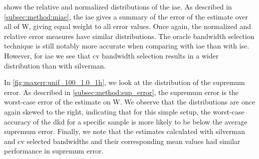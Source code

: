  shows the relative and normalized distributions of the \gls{iae}.
As described in \cref{subsec:method:miae},
the \gls{iae} gives a summary of the error of the estimate over all of \gls{W},
giving equal weight to all error values.
Once again, the normalized and relative error measures have similar distributions.
The \gls{oracle} bandwidth selection technique is still notably more accurate when comparing with \gls{iae} than with \gls{ise}.
However, for \gls{iae} we see that \gls{cv} bandwidth selection results in a wider distribution than with \gls{silverman}.

In \cref{fig:maxerr:unif_100_1.0_1h}, we look at the distribution of the \gls{supremum error}.
As described in \cref{subsec:method:sup_error},
the \gls{supremum error} is the worst-case error of the estimate on \gls{W}.
We observe that the distributions are once again skewed to the right,
indicating that for this simple setup,
the worst-case accuracy of the \gls{dkd} for a specific sample is more likely to be below the average \gls{supremum error}.
Finally, we note that the estimates calculated with \gls{silverman} and \gls{cv}
selected bandwidths and their corresponding mean values had similar performance in \gls{supremum error}.


